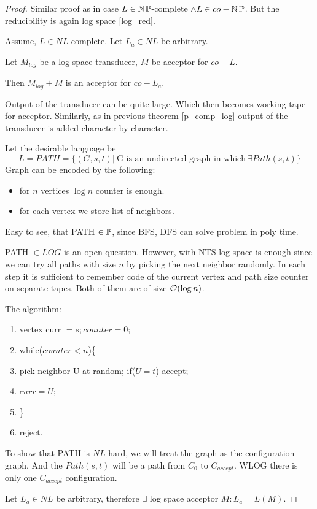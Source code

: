 \begin{proof}
	Similar proof as in case $L \in \operatorname{\operatorname{\mathbb{N}}\mathbb{P}}$-complete $\land L \in co-\operatorname{\operatorname{\mathbb{N}}\mathbb{P}}$.
	But the reducibility is again log space \cref{log_red}.

	Assume, $L \in NL$-complete.
	Let $L_a \in NL$ be arbitrary.

	Let $M_{log}$ be a log space transducer, $M$ be acceptor for $co-L$.

	Then $M_{log} + M$ is an acceptor for $co-L_a$.

	Output of the transducer can be quite large.
	Which then becomes working tape for acceptor.
	Similarly, as in previous theorem \cref{p_comp_log} output of the transducer is added character by character.

	Let the desirable language be
	\[ L = PATH = \{ (G, s, t)|\ \text{G is an undirected graph in which}\ \exists Path(s, t) \} \]
	Graph can be encoded by the following:
	\begin{itemize}
		\item for $n$ vertices $\log n$ counter is enough.
		\item for each vertex we store list of neighbors.
	\end{itemize}

	Easy to see, that PATH $\in \operatorname{\mathbb{P}}$, since BFS, DFS can solve problem in poly time.

	PATH $\in LOG$ is an open question.
	However, with NTS log space is enough since we can try all paths with size $n$ by picking the next neighbor randomly.
	In each step it is sufficient to remember code of the current vertex and path size counter on separate tapes.
	Both of them are of size $\mathcal{O}(\log n)$.

	The algorithm:
	\begin{enumerate}
		\item vertex curr $= s; counter = 0$;
		\item while($counter < n$)\{
		\item pick neighbor U at random; if($U = t$) accept;
		\item $curr = U$;
		\item \}
		\item reject.
	\end{enumerate}

	To show that PATH is $NL$-hard, we will treat the graph as the configuration graph.
	And the $Path(s, t)$ will be a path from $C_0$ to $C_{accept}$.
	WLOG there is only one $C_{accept}$ configuration.

	Let $L_a \in NL$ be arbitrary, therefore $\exists$ log space acceptor $M: L_a = L(M)$.


\end{proof}
